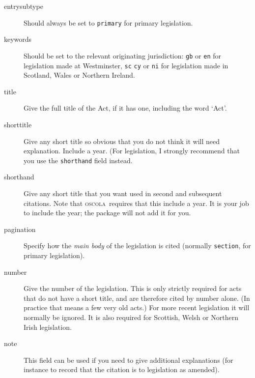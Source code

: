 \documentclass[a5paper,fontsize=9pt,DIV=1]{scrartcl}
\newcommand{\oscolashort}{\textsc{oscola}\nocite{oscola}}
\begin{document}
\begin{description}
\item[entrysubtype] Should always be set to \texttt{primary} for
  primary legislation.
\item[keywords]
Should be set to the relevant originating jurisdiction:
  \texttt{gb} or \texttt{en} for legislation made at Westminster,
  \texttt{sc} \texttt{cy} or \texttt{ni} for legislation made in
  Scotland, Wales or Northern Ireland.
\item[title]
  Give the full title of the Act, if it has one, including
  the word `Act'.
\item[shorttitle]
Give any short title so obvious that you do not
  think it will need explanation. Include a year. (For legislation, I
  strongly recommend that you use the \texttt{shorthand} field
  instead.
\item[shorthand]
Give any short title that you want used in second and
  subsequent citations. Note that \oscolashort\ requires that this
  include a year. It is your job to include the
  year; the package will not add it for you.
\item[pagination]
Specify how the \emph{main body} of the legislation
  is cited (normally \texttt{section}, for primary legislation).
\item[number]
 Give the number of the legislation. This is only
  strictly required for acts that do not have a short title, and are
  therefore cited by number alone. (In practice that means a few very
  old acts.) For more recent legislation it will normally be
  ignored. It is also required for Scottish, Welsh or Northern Irish
  legislation.
\item[note]
This field can be used if you need to give additional
  explanations (for instance to record that the citation is to
  legislation as amended).
\end{description}
\end{document}
